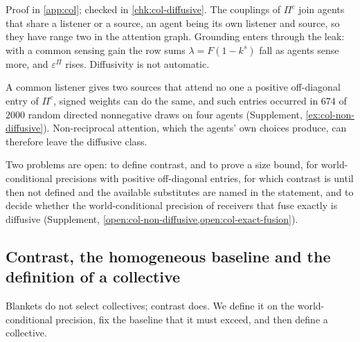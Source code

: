 Proof in \cref{app:col}; checked in \cref{chk:col-diffusive}. The couplings of $\Pi^c$ join agents that share a listener or a source, an agent being its own listener and source, so they have range two in the attention graph. Grounding enters through the leak: with a common sensing gain the row sums $\lambda=F(1-k^s)$ fall as agents sense more, and $\varepsilon^\Pi$ rises. Diffusivity is not automatic.

A common listener gives two sources that attend no one a positive off-diagonal entry of $\Pi^c$, signed weights can do the same, and such entries occurred in $674$ of $2000$ random directed nonnegative draws on four agents (Supplement, \cref{ex:col-non-diffusive}). Non-reciprocal attention, which the agents' own choices produce, can therefore leave the diffusive class.

Two problems are open: to define contrast, and to prove a size bound, for world-conditional precisions with positive off-diagonal entries, for which contrast is until then not defined and the available substitutes are named in the statement, and to decide whether the world-conditional precision of receivers that fuse exactly is diffusive (Supplement, \cref{open:col-non-diffusive,open:col-exact-fusion}).

\subsection{Contrast, the homogeneous baseline and the definition of a collective}\label{sec:col-contrast}

Blankets do not select collectives; contrast does. We define it on the world-conditional precision, fix the baseline that it must exceed, and then define a collective.

